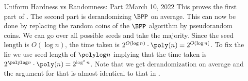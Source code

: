 \begin{lecture}{8}{Uniform Hardness vs Randomness: Part 2}{March 10, 2022}
This proves the first part of . The second part is derandomizing $\BPP$ on average. This can now be done by replacing the random coins of the $\BPP$ algorithm by pseudorandom coins. We can go over all possible seeds and take the majority. 
Since the seed length is $O(\log n)$, the time taken is $2^{O(\log n)} \cdot \poly(n) = 2^{O(\log n)}$. 
To fix the lie we use seed length of $\polylog n$ implying that the time taken is $2^{\polylog n} \cdot \poly(n) = 2^{\log^c n}$. 
Note that we get derandomization on average and the argument for that is almost identical to that in .


\end{lecture}
